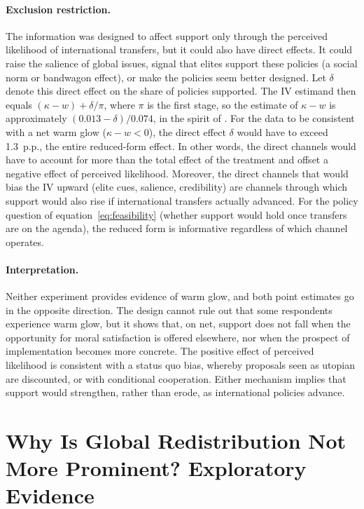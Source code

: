 \documentclass[12pt,english]{article}
\begin{document}
\paragraph{Exclusion restriction.} The information was designed to affect support only through the perceived likelihood of international transfers, but it could also have direct effects. It could raise the salience of global issues, signal that elites support these policies (a social norm or bandwagon effect), or make the policies seem better designed. Let $\delta$ denote this direct effect on the share of policies supported. The IV estimand then equals $(\kappa - w) + \delta/\pi$, where $\pi$ is the first stage, so the estimate of $\kappa - w$ is approximately $(0.013 - \delta)/0.074$, in the spirit of \cite{conley_plausibly_2012}. For the data to be consistent with a net warm glow ($\kappa - w < 0$), the direct effect $\delta$ would have to exceed 1.3~p.p., the entire reduced-form effect. In other words, the direct channels would have to account for more than the total effect of the treatment and offset a negative effect of perceived likelihood. Moreover, the direct channels that would bias the IV upward (elite cues, salience, credibility) are channels through which support would also rise if international transfers actually advanced. For the policy question of equation~\eqref{eq:feasibility} (whether support would hold once transfers are on the agenda), the reduced form is informative regardless of which channel operates.

\paragraph{Interpretation.} Neither experiment provides evidence of warm glow, and both point estimates go in the opposite direction. The design cannot rule out that some respondents experience warm glow, but it shows that, on net, support does not fall when the opportunity for moral satisfaction is offered elsewhere, nor when the prospect of implementation becomes more concrete. The positive effect of perceived likelihood is consistent with a status quo bias, whereby proposals seen as utopian are discounted, or with conditional cooperation. Either mechanism implies that support would strengthen, rather than erode, as international policies advance.

\section{Why Is Global Redistribution Not More Prominent? Exploratory Evidence}\label{sec:gap}
\end{document}
